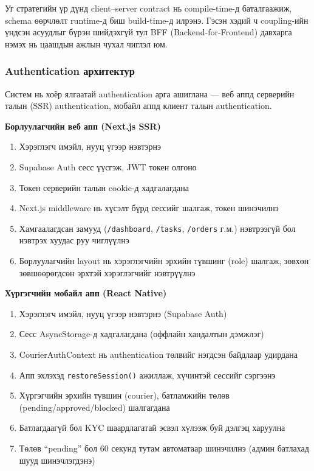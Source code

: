 Уг стратегийн үр дүнд client–server contract нь compile-time-д баталгаажиж, schema өөрчлөлт runtime-д биш build-time-д илрэнэ. Гэсэн хэдий ч coupling-ийн үндсэн асуудлыг бүрэн шийдэхгүй тул BFF (Backend-for-Frontend) давхарга нэмэх нь цаашдын ажлын чухал чиглэл юм.

\subsubsection{Authentication архитектур}
\label{subsubsec:auth_architecture}

Систем нь хоёр ялгаатай authentication арга ашиглана — веб аппд серверийн талын (SSR) authentication, мобайл аппд клиент талын authentication.

\textbf{Борлуулагчийн веб апп (Next.js SSR)}

\begin{enumerate}
  \item Хэрэглэгч имэйл, нууц үгээр нэвтэрнэ
  \item Supabase Auth сесс үүсгэж, JWT токен олгоно
  \item Токен серверийн талын cookie-д хадгалагдана
  \item Next.js middleware нь хүсэлт бүрд сессийг шалгаж, токен шинэчилнэ
  \item Хамгаалагдсан замууд (\texttt{/dashboard}, \texttt{/tasks}, \texttt{/orders} г.м.) нэвтрээгүй бол нэвтрэх хуудас руу чиглүүлнэ
  \item Борлуулагчийн layout нь хэрэглэгчийн эрхийн түвшинг (role) шалгаж, зөвхөн зөвшөөрөгдсөн эрхтэй хэрэглэгчийг нэвтрүүлнэ
\end{enumerate}

\textbf{Хүргэгчийн мобайл апп (React Native)}

\begin{enumerate}
  \item Хэрэглэгч имэйл, нууц үгээр нэвтэрнэ (Supabase Auth)
  \item Сесс AsyncStorage-д хадгалагдана (оффлайн хандалтын дэмжлэг)
  \item CourierAuthContext нь authentication төлвийг нэгдсэн байдлаар удирдана
  \item Апп эхлэхэд \texttt{restoreSession()} ажиллаж, хүчинтэй сессийг сэргээнэ
  \item Хүргэгчийн эрхийн түвшин (courier), батламжийн төлөв (pending/approved/blocked) шалгагдана
  \item Батлагдаагүй бол KYC шаардлагатай эсвэл хүлээж буй дэлгэц харуулна
  \item Төлөв ``pending'' бол 60 секунд тутам автоматаар шинэчилнэ (админ батлахад шууд шинэчлэгдэнэ)
\end{enumerate}

